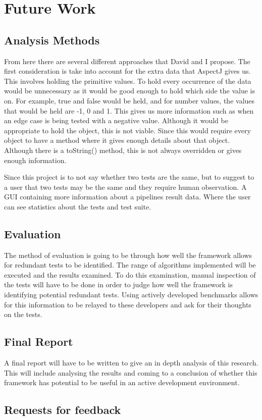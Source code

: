 \chapter{Future Work}\label{C:future}

\section{Analysis Methods}
From here there are several different approaches that David and I propose. The first consideration is take into account for the extra data that AspectJ gives us. This involves holding the primitive values. To hold every occurrence of the data would be unnecessary as it would be good enough to hold which side the value is on. For example, true and false would be held, and for number values, the values that would be held are -1, 0 and 1. This gives us more information such as when an edge case is being tested with a negative value. Although it would be appropriate to hold the object, this is not viable. Since this would require every object to have a method where it gives enough details about that object. Although there is a toString() method, this is not always overridden or gives enough information.

Since this project is to not say whether two tests are the same, but to suggest to a user that two tests may be the same and they require human observation. A GUI containing more information about a pipelines result data. Where the user can see statistics about the tests and test suite. 

\section{Evaluation}
The method of evaluation is going to be through how well the framework allows for redundant tests to be identified. The range of algorithms implemented will be executed and the results examined. To do this examination, manual inspection of the tests will have to be done in order to judge how well the framework is identifying potential redundant tests. Using actively developed benchmarks allows for this information to be relayed to these developers and ask for their thoughts on the tests. 

\section{Final Report}
A final report will have to be written to give an in depth analysis of this research. This will include analysing the results and coming to a conclusion of whether this framework has potential to be useful in an active development environment. 

\section{Requests for feedback}

